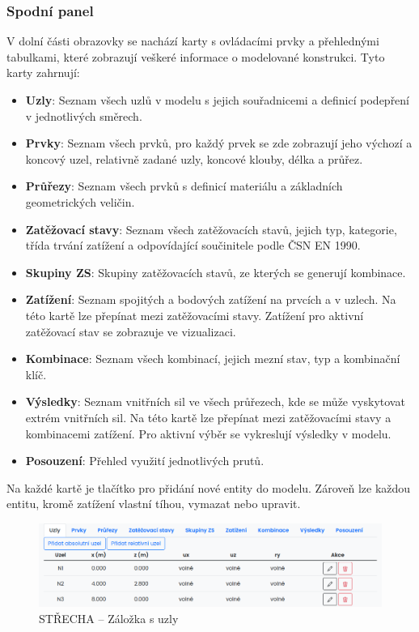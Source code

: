 \subsubsection*{Spodní panel}
V dolní části obrazovky se nachází karty s ovládacími prvky a přehlednými tabulkami, které zobrazují veškeré informace o modelované konstrukci. Tyto karty zahrnují:
\begin{itemize}
    \item \textbf{Uzly}: Seznam všech uzlů v modelu s jejich souřadnicemi a definicí podepření v jednotlivých směrech.
    \item \textbf{Prvky}: Seznam všech prvků, pro každý prvek se zde zobrazují jeho výchozí a koncový uzel, relativně zadané uzly, koncové klouby, délka a průřez.
    \item \textbf{Průřezy}: Seznam všech prvků s definicí materiálu a základních geometrických veličin.
    \item \textbf{Zatěžovací stavy}: Seznam všech zatěžovacích stavů, jejich typ, kategorie, třída trvání zatížení a odpovídající součinitele podle ČSN EN 1990.
    \item \textbf{Skupiny ZS}: Skupiny zatěžovacích stavů, ze kterých se generují kombinace.
    \item \textbf{Zatížení}: Seznam spojitých a bodových zatížení na prvcích a v uzlech. Na této kartě lze přepínat mezi zatěžovacími stavy. Zatížení pro aktivní zatěžovací stav se zobrazuje ve vizualizaci.
    \item \textbf{Kombinace}: Seznam všech kombinací, jejich mezní stav, typ a kombinační klíč.
    \item \textbf{Výsledky}: Seznam vnitřních sil ve všech průřezech, kde se může vyskytovat extrém vnitřních sil. Na této kartě lze přepínat mezi zatěžovacími stavy a kombinacemi zatížení. Pro aktivní výběr se vykreslují výsledky v modelu.
    \item \textbf{Posouzení}: Přehled využití jednotlivých prutů.
\end{itemize}

Na každé kartě je tlačítko pro přidání nové entity do modelu. Zároveň lze každou entitu, kromě zatížení vlastní tíhou, vymazat nebo upravit.

\begin{figure}[H]
    \includegraphics{assets/figures/wbapp/nodes_tab.png}
    \caption{STŘECHA -- Záložka s uzly}
    \label{fig:nodes}
\end{figure}

